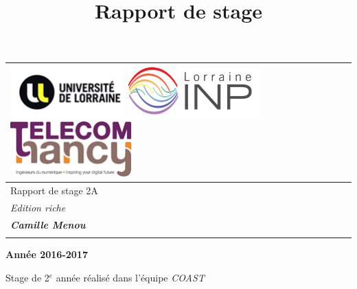\documentclass[12pt]{article}
\title{Rapport de stage}
\begin{document}
\begin{center}

\vspace{3pt} \noindent
\begin{tabular}{p{439pt}}
\parbox{439pt}{\centering \includegraphics[width=125pt]{gallery/img-3.png}\textbf{{\large 
\includegraphics[width=146pt]{gallery/img-2.png}
}}\includegraphics[width=132pt]{gallery/img-1.png}{\small  }} \\

\hline
\vspace{5cm}
\parbox{439pt}{\centering 
{\Huge Rapport de stage 2A}
} \\
\vspace{1pt}
\parbox{439pt}{\centering 
\textit{{\Huge Edition riche}}
} \\
\vspace{2cm}
\parbox{439pt}{\centering 
\textbf{\textit{{\Large Camille Menou}}}
} \\
\parbox{439pt}{\centering } \\
\end{tabular}

\end{center}



\begin{center}
\textbf{Ann\'{e}e 2016-2017}
\end{center}

\begin{center}
Stage de 2$^{e}$ année réalisé dans l'équipe \textit{COAST}
\end{center}
\end{document}
